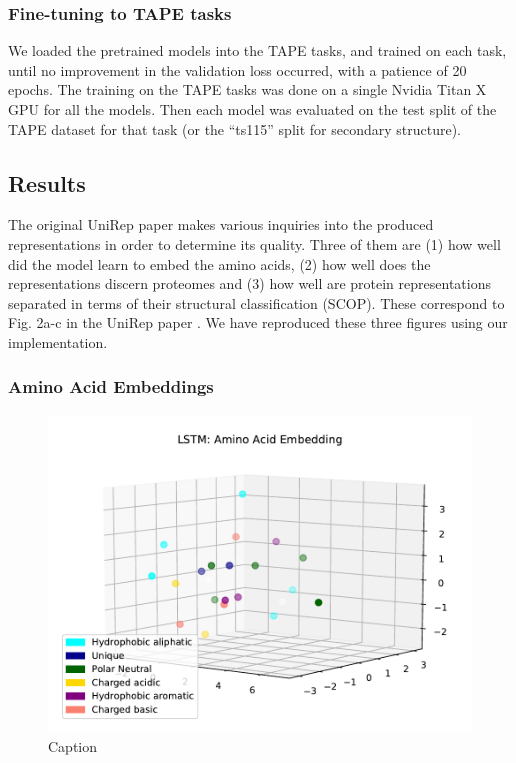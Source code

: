 \documentclass[a4paper,12pt]{article}
\begin{document}
\subsubsection{Fine-tuning to TAPE tasks}
We loaded the pretrained models into the TAPE tasks, and trained on each task, until no improvement in the validation loss occurred, with a patience of 20 epochs. The training on the TAPE tasks was done on a single Nvidia Titan X GPU for all the models. Then each model was evaluated on the test split of the TAPE dataset for that task (or the ``ts115'' split for secondary structure).

\subsection{Results}
The original UniRep paper makes various inquiries into the produced representations in order to determine its quality. Three of them are (1) how well did the model learn to embed the amino acids, (2) how well does the representations discern proteomes and (3) how well are protein representations separated in terms of their structural classification (SCOP). These correspond to Fig. 2a-c in the UniRep paper \cite{alley2019unified}. We have reproduced these three figures using our implementation.

\subsubsection{Amino Acid Embeddings}

\begin{figure}[H]
    \centering
    \includegraphics[width=0.8\linewidth]{figures/fig2a_LSTM.pdf}
    \caption{Caption}
    \label{fig:fig2a_LSTM}
\end{figure}
\end{document}
